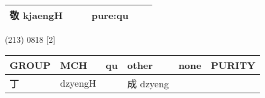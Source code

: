 \documentclass[14pt,a4paper]{scrartcl}
\begin{document}
\begin{longtable}[c]{@{}llllll@{}}
\begin{minipage}[t]{0.14\columnwidth}\raggedright\strut
敬 kjaengH
\strut\end{minipage} &
\begin{minipage}[t]{0.14\columnwidth}\raggedright\strut
\strut\end{minipage} &
\begin{minipage}[t]{0.14\columnwidth}\raggedright\strut
\strut\end{minipage} &
\begin{minipage}[t]{0.14\columnwidth}\raggedright\strut
pure:qu
\strut\end{minipage}\tabularnewline
\bottomrule
\end{longtable}

(213) 0818 {[}2{]}

\begin{longtable}[c]{@{}llllll@{}}
\toprule
\begin{minipage}[b]{0.14\columnwidth}\raggedright\strut
GROUP
\strut\end{minipage} &
\begin{minipage}[b]{0.14\columnwidth}\raggedright\strut
MCH
\strut\end{minipage} &
\begin{minipage}[b]{0.14\columnwidth}\raggedright\strut
qu
\strut\end{minipage} &
\begin{minipage}[b]{0.14\columnwidth}\raggedright\strut
other
\strut\end{minipage} &
\begin{minipage}[b]{0.14\columnwidth}\raggedright\strut
none
\strut\end{minipage} &
\begin{minipage}[b]{0.14\columnwidth}\raggedright\strut
PURITY
\strut\end{minipage}\tabularnewline
\midrule
\endhead
\begin{minipage}[t]{0.14\columnwidth}\raggedright\strut
丁
\strut\end{minipage} &
\begin{minipage}[t]{0.14\columnwidth}\raggedright\strut
dzyengH
\strut\end{minipage} &
\begin{minipage}[t]{0.14\columnwidth}\raggedright\strut
\strut\end{minipage} &
\begin{minipage}[t]{0.14\columnwidth}\raggedright\strut
成 dzyeng
\strut\end{minipage} &
\begin{minipage}[t]{0.14\columnwidth}\raggedright\strut

\end{minipage}
\end{longtable}
\end{document}
